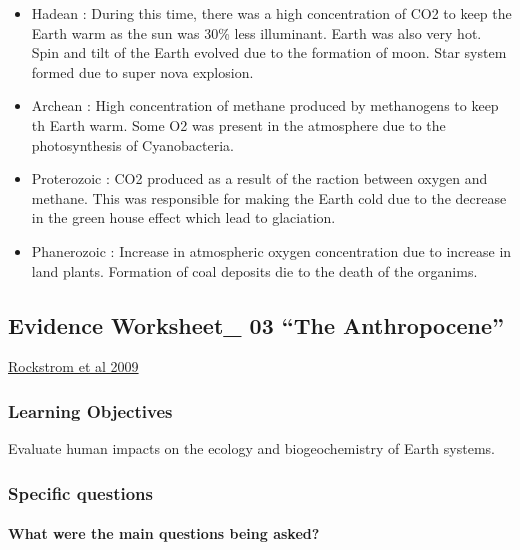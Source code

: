 \documentclass[]{article}
\let\oldparagraph\paragraph
\renewcommand{\paragraph}[1]{\oldparagraph{#1}\mbox{}}
\begin{document}
\begin{itemize}
  \begin{itemize}
  \item
    Hadean : During this time, there was a high concentration of CO2 to
    keep the Earth warm as the sun was 30\% less illuminant. Earth was
    also very hot. Spin and tilt of the Earth evolved due to the
    formation of moon. Star system formed due to super nova explosion.
  \item
    Archean : High concentration of methane produced by methanogens to
    keep th Earth warm. Some O2 was present in the atmosphere due to the
    photosynthesis of Cyanobacteria.
  \item
    Proterozoic : CO2 produced as a result of the raction between oxygen
    and methane. This was responsible for making the Earth cold due to
    the decrease in the green house effect which lead to glaciation.
  \item
    Phanerozoic : Increase in atmospheric oxygen concentration due to
    increase in land plants. Formation of coal deposits die to the death
    of the organims.
  \end{itemize}
\end{itemize}

\subsection{\texorpdfstring{Evidence Worksheet\_ 03 ``The
Anthropocene''}{Evidence Worksheet\_ 03 The Anthropocene}}\label{evidence-worksheet_-03-the-anthropocene}

\href{https://www.nature.com/articles/461472a}{Rockstrom et al 2009}

\subsubsection{Learning Objectives}\label{learning-objectives-2}

Evaluate human impacts on the ecology and biogeochemistry of Earth
systems.

\subsubsection{Specific questions}\label{specific-questions}

\paragraph{What were the main questions being
asked?}\label{what-were-the-main-questions-being-asked-1}
\end{document}
